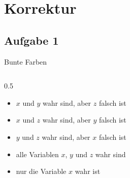 \documentclass[aspectratio=169,usepdftitle=true,11pt,ngerman,t]{beamer}
\subtitle{Tutorium 7}
\date{30. Juni 2026}
\begin{document}
\section{Korrektur}

\subsection{Aufgabe 1}
\begin{frame}{Bunte Farben}\onslide<+->
    \vspace*{-1.5\abovedisplayskip}
    \begin{columns}[T]
    \begin{column}{0.5\textwidth}
        \begin{exercise}
            \begin{itemize}[<+->]
                \item \(x\) und \(y\) wahr sind, aber \(z\) falsch ist
                \item \(x\) und \(z\) wahr sind, aber \(y\) falsch ist
                \item \(y\) und \(z\) wahr sind, aber \(x\) falsch ist
                \item alle Variablen \(x\), \(y\) und \(z\) wahr sind
                \item nur die Variable \(x\) wahr ist
            \end{itemize}
        \end{exercise}\resetex
    \end{column}

\end{columns}
\end{frame}
\end{document}
